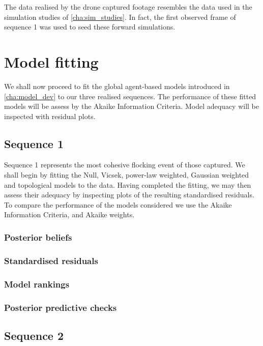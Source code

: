 The data realised by the drone captured footage resembles the data used in the
simulation studies of \cref{cha:sim_studies}. In fact, the first observed frame
of sequence 1 was used to seed these forward simulations.
    
\section{Model fitting}

We shall now proceed to fit the global agent-based models introduced in
\cref{cha:model_dev} to our three realised sequences. The performance of these
fitted models will be assess by the Akaike Information Criteria. Model adequacy
will be inspected with residual plots.

\subsection{Sequence 1}

Sequence 1 represents the most cohesive flocking event of those captured. We
shall begin by fitting the Null, Vicsek, power-law weighted, Gaussian weighted
and topological models to the data. Having completed the fitting, we may then
assess their adequacy by inspecting plots of the resulting standardised
residuals. To compare the performance of the models considered we use the
Akaike Information Criteria, and Akaike weights.

\subsubsection{Posterior beliefs}

\subsubsection{Standardised residuals}

\subsubsection{Model rankings}

\subsubsection{Posterior predictive checks}

\subsection{Sequence 2}

